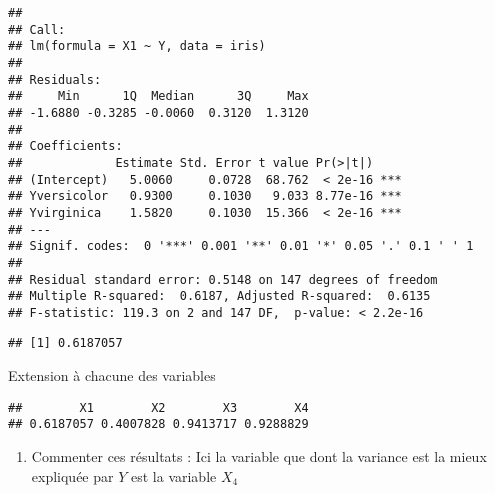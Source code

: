 \documentclass[
]{article}
\newenvironment{Shaded}{\begin{snugshade}}{\end{snugshade}}
\newcommand{\ControlFlowTok}[1]{\textcolor[rgb]{0.13,0.29,0.53}{\textbf{#1}}}
\newcommand{\DataTypeTok}[1]{\textcolor[rgb]{0.13,0.29,0.53}{#1}}
\newcommand{\DecValTok}[1]{\textcolor[rgb]{0.00,0.00,0.81}{#1}}
\newcommand{\KeywordTok}[1]{\textcolor[rgb]{0.13,0.29,0.53}{\textbf{#1}}}
\newcommand{\NormalTok}[1]{#1}
\newcommand{\OperatorTok}[1]{\textcolor[rgb]{0.81,0.36,0.00}{\textbf{#1}}}
\newcommand{\StringTok}[1]{\textcolor[rgb]{0.31,0.60,0.02}{#1}}
\providecommand{\tightlist}{%
  \setlength{\itemsep}{0pt}\setlength{\parskip}{0pt}}
\begin{document}
\begin{verbatim}
## 
## Call:
## lm(formula = X1 ~ Y, data = iris)
## 
## Residuals:
##     Min      1Q  Median      3Q     Max 
## -1.6880 -0.3285 -0.0060  0.3120  1.3120 
## 
## Coefficients:
##             Estimate Std. Error t value Pr(>|t|)    
## (Intercept)   5.0060     0.0728  68.762  < 2e-16 ***
## Yversicolor   0.9300     0.1030   9.033 8.77e-16 ***
## Yvirginica    1.5820     0.1030  15.366  < 2e-16 ***
## ---
## Signif. codes:  0 '***' 0.001 '**' 0.01 '*' 0.05 '.' 0.1 ' ' 1
## 
## Residual standard error: 0.5148 on 147 degrees of freedom
## Multiple R-squared:  0.6187, Adjusted R-squared:  0.6135 
## F-statistic: 119.3 on 2 and 147 DF,  p-value: < 2.2e-16
\end{verbatim}

\begin{Shaded}
\end{Shaded}

\begin{verbatim}
## [1] 0.6187057
\end{verbatim}

Extension à chacune des variables

\begin{Shaded}
\end{Shaded}

\begin{verbatim}
##        X1        X2        X3        X4 
## 0.6187057 0.4007828 0.9413717 0.9288829
\end{verbatim}

\begin{enumerate}
\def\labelenumi{\arabic{enumi}.}
\setcounter{enumi}{5}
\tightlist
\item
  Commenter ces résultats : Ici la variable que dont la variance est la
  mieux expliquée par \(Y\) est la variable \(X_4\)
\end{enumerate}
\end{document}
